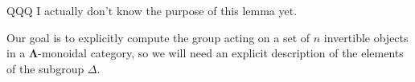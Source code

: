 \documentclass{amsbook} %
\newcommand{\ML}{\mathbf{\Lambda}}
\newcommand{\ELnn}{E\Lambda(\underline{2n})}
\numberwithin{section}{chapter}
\begin{document}




QQQ I actually don't know the purpose of this lemma yet.

Our goal is to explicitly compute the group acting on a set of $n$ invertible objects in a $\ML$-monoidal category, so we will need an explicit description of the elements of the subgroup $\Delta$.
\end{document}
